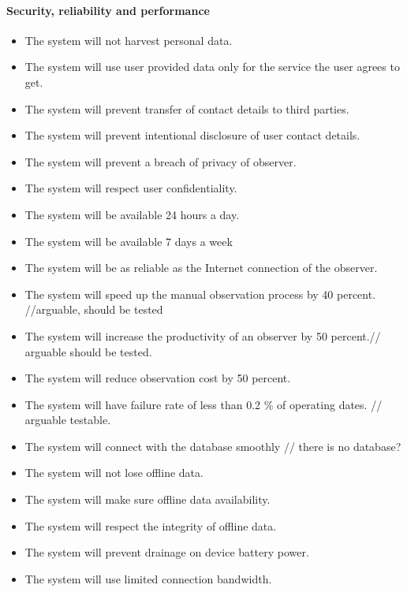     \paragraph{Security, reliability and performance}
	\begin{itemize}
		\item The system will not harvest personal data.
        \item The system will use user provided data only for the service the user agrees to get.
        \item The system will prevent transfer of contact details to third parties.
        \item The system will prevent intentional disclosure of user contact details.
        \item The system will prevent a breach of privacy of observer.
        \item The system will respect user confidentiality.
        \item The system will be available 24 hours a day.
        \item The system will be available 7 days a week
        \item The system will be as reliable as the Internet connection of the observer.
        \item The system will speed up the manual observation process by 40 percent. //arguable, should be tested
        \item The system will increase the productivity of an observer by 50 percent.// arguable should be tested.
        \item The system will reduce observation cost by 50 percent.
        \item The system will have failure rate of less than 0.2 \% of operating dates. // arguable testable.
        \item The system will connect with the database smoothly // there is no database?
        \item The system will not lose offline data.
        \item The system will make sure offline data availability.
        \item The system will respect the integrity of offline data.
        \item The system will prevent drainage on device battery power.
        \item The system will use limited connection bandwidth.

\end{itemize}
